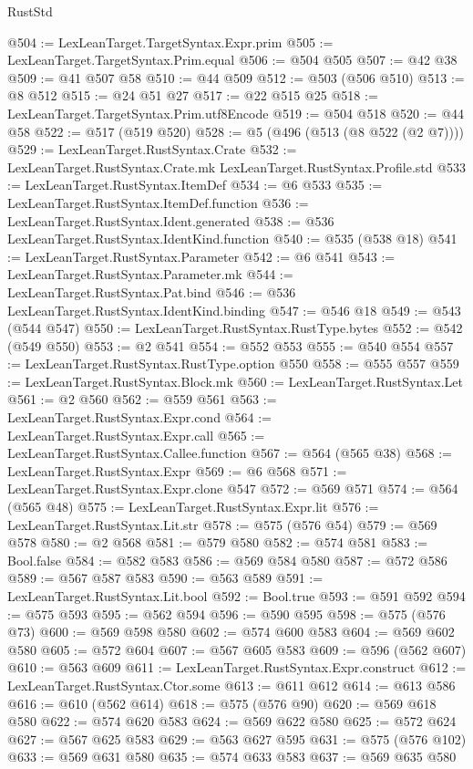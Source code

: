 \begin{lexlean}{RustStd}
\begin{coremodule}
@504 := LexLeanTarget.TargetSyntax.Expr.prim
@505 := LexLeanTarget.TargetSyntax.Prim.equal
@506 := @504 @505
@507 := @42 @38
@509 := @41 @507 @58
@510 := @44 @509
@512 := @503 (@506 @510)
@513 := @8 @512
@515 := @24 @51 @27
@517 := @22 @515 @25
@518 := LexLeanTarget.TargetSyntax.Prim.utf8Encode
@519 := @504 @518
@520 := @44 @58
@522 := @517 (@519 @520)
@528 := @5 (@496 (@513 (@8 @522 (@2 @7))))
@529 := LexLeanTarget.RustSyntax.Crate
@532 := LexLeanTarget.RustSyntax.Crate.mk LexLeanTarget.RustSyntax.Profile.std
@533 := LexLeanTarget.RustSyntax.ItemDef
@534 := @6 @533
@535 := LexLeanTarget.RustSyntax.ItemDef.function
@536 := LexLeanTarget.RustSyntax.Ident.generated
@538 := @536 LexLeanTarget.RustSyntax.IdentKind.function
@540 := @535 (@538 @18)
@541 := LexLeanTarget.RustSyntax.Parameter
@542 := @6 @541
@543 := LexLeanTarget.RustSyntax.Parameter.mk
@544 := LexLeanTarget.RustSyntax.Pat.bind
@546 := @536 LexLeanTarget.RustSyntax.IdentKind.binding
@547 := @546 @18
@549 := @543 (@544 @547)
@550 := LexLeanTarget.RustSyntax.RustType.bytes
@552 := @542 (@549 @550)
@553 := @2 @541
@554 := @552 @553
@555 := @540 @554
@557 := LexLeanTarget.RustSyntax.RustType.option @550
@558 := @555 @557
@559 := LexLeanTarget.RustSyntax.Block.mk
@560 := LexLeanTarget.RustSyntax.Let
@561 := @2 @560
@562 := @559 @561
@563 := LexLeanTarget.RustSyntax.Expr.cond
@564 := LexLeanTarget.RustSyntax.Expr.call
@565 := LexLeanTarget.RustSyntax.Callee.function
@567 := @564 (@565 @38)
@568 := LexLeanTarget.RustSyntax.Expr
@569 := @6 @568
@571 := LexLeanTarget.RustSyntax.Expr.clone @547
@572 := @569 @571
@574 := @564 (@565 @48)
@575 := LexLeanTarget.RustSyntax.Expr.lit
@576 := LexLeanTarget.RustSyntax.Lit.str
@578 := @575 (@576 @54)
@579 := @569 @578
@580 := @2 @568
@581 := @579 @580
@582 := @574 @581
@583 := Bool.false
@584 := @582 @583
@586 := @569 @584 @580
@587 := @572 @586
@589 := @567 @587 @583
@590 := @563 @589
@591 := LexLeanTarget.RustSyntax.Lit.bool
@592 := Bool.true
@593 := @591 @592
@594 := @575 @593
@595 := @562 @594
@596 := @590 @595
@598 := @575 (@576 @73)
@600 := @569 @598 @580
@602 := @574 @600 @583
@604 := @569 @602 @580
@605 := @572 @604
@607 := @567 @605 @583
@609 := @596 (@562 @607)
@610 := @563 @609
@611 := LexLeanTarget.RustSyntax.Expr.construct
@612 := LexLeanTarget.RustSyntax.Ctor.some
@613 := @611 @612
@614 := @613 @586
@616 := @610 (@562 @614)
@618 := @575 (@576 @90)
@620 := @569 @618 @580
@622 := @574 @620 @583
@624 := @569 @622 @580
@625 := @572 @624
@627 := @567 @625 @583
@629 := @563 @627 @595
@631 := @575 (@576 @102)
@633 := @569 @631 @580
@635 := @574 @633 @583
@637 := @569 @635 @580

\end{coremodule}
\end{lexlean}
